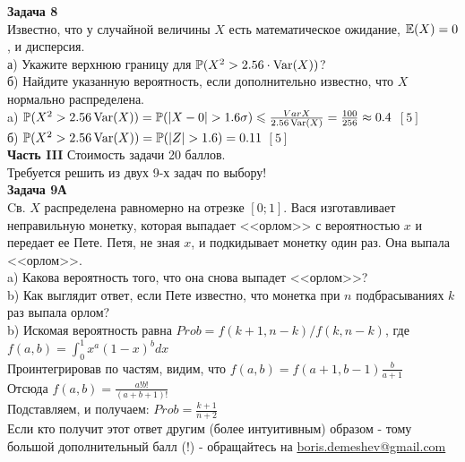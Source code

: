 \documentclass[pdftex,12pt,a4paper]{article}
\begin{document}
\textbf{Задача 8} \\ %
Известно, что у случайной величины $X$ есть
математическое
ожидание, $\mathbb{E}(X)=0$, и дисперсия. \\
а) Укажите верхнюю границу для $\mathbb{P}(X^{2}>2.56\cdot \operatorname{Var}(X))$? \\%
б) Найдите указанную вероятность, если дополнительно известно, что
$X$ нормально распределена. \\%
a) $\P(X^{2}>2.56\Var(X))=\P(|X-0|>1.6\sigma)\le
\frac{Var{X}}{2.56\Var(X)}=\frac{100}{256}\approx 0.4$ $[5]$\\
б) $\P(X^{2}>2.56\Var(X))=\P(|Z|>1.6)=0.11$ $[5]$\\

\textbf{Часть III} Стоимость задачи 20 баллов. \\
Требуется решить \textbf{} из двух 9-х задач по
выбору! \\

\textbf{Задача 9А} \\
Cв.  $X$ распределена равномерно на отрезке $[0;1]$. Вася изготавливает неправильную монетку, которая выпадает <<орлом>> с вероятностью  $x$ и передает ее Пете.
Петя, не зная $x$, и подкидывает монетку один раз. Она выпала
<<орлом>>. \\
a) Какова вероятность того, что она снова выпадет
<<орлом>>? \\
b) Как выглядит ответ, если Пете известно, что монетка при
$n$ подбрасываниях  $k$  раз выпала орлом? \\

b) Искомая вероятность равна $Prob=f(k+1,n-k)/f(k,n-k)$, где \\
$f(a,b)=\int_{0}^{1}x^{a}(1-x)^{b}dx$ \\
Проинтегрировав по частям, видим, что $f(a,b)=f(a+1,b-1)\frac{b}{a+1}$ \\
Отсюда $f(a,b)=\frac{a!b!}{(a+b+1)!}$ \\
Подставляем, и получаем: $Prob=\frac{k+1}{n+2}$ \\
Если кто получит этот ответ другим (более интуитивным) образом - тому большой дополнительный балл (!) - обращайтесь на \href{mailto:boris.demeshev@gmail.com}{boris.demeshev@gmail.com} \\
\end{document}
